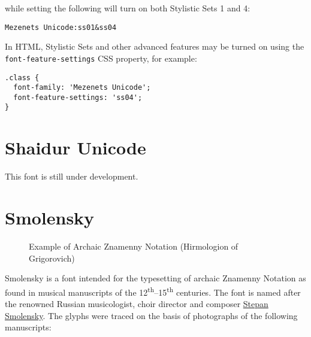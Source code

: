 \documentclass[11pt]{article}
\begin{document}
\noindent while setting the following will turn on both Stylistic Sets 1 and 4:

\begin{verbatim}
Mezenets Unicode:ss01&ss04
\end{verbatim}

In HTML, Stylistic Sets and other advanced features may be turned on using the
\texttt{font-feature-settings} CSS property, for example:

\begin{verbatim}
.class {
  font-family: 'Mezenets Unicode';
  font-feature-settings: 'ss04';
}
\end{verbatim}


\section{Shaidur Unicode}

This font is still under development.

\section{Smolensky}

\begin{figure}[tb]
\centering
\begin{minipage}{0.75\textwidth}
\begin{churchslavonic}
\archaic
\noindent
\Large
{}
\end{churchslavonic}
\end{minipage}
\caption{Example of Archaic Znamenny Notation (Hirmologion of Grigorovich) \label{smolensky}}
\end{figure}

Smolensky is a font intended for the typesetting of archaic Znamenny Notation
as found in musical manuscripts of the 12\textsuperscript{th}--15\textsuperscript{th}
centuries. The font is named after the renowned Russian musicologist,
choir director and composer
\href{https://en.wikipedia.org/wiki/Stepan_Smolensky}{Stepan Smolensky}.
The glyphs were traced on the basis of photographs of the following manuscripts:
\end{document}
